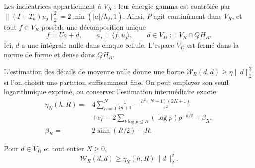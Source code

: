Les indicatrices appartiennent à \(V_R\) : leur énergie gamma est contrôlée par \(\|(I-T_a)u_j\|_2^2=2\min(|a|/h_j,1)\). Ainsi, \(P\) agit continûment dans \(V_R\), et tout \(f\in V_R\) possède une décomposition unique
\begin{equation}
f=Ua+d,\qquad a_j=\langle f,u_j\rangle,\qquad
d\in V_D:=V_R\cap QH_R.
\label{schur-add-display-4}
\end{equation}
Ici, \(d\) a une intégrale nulle dans chaque cellule. L'espace \(V_D\) est
fermé dans la norme de forme et dense dans \(QH_R\).

L'estimation des détails de moyenne nulle donne une borne \(\mathscr W_R(d,d)\geq\eta\|d\|_2^2\) si l'on choisit une partition suffisamment fine. On peut employer son seuil logarithmique exprimé, ou conserver l'estimation intermédiaire exacte
\begin{equation}
\begin{aligned}
\eta_N(h,R)={}&4\sum_{n=0}^N\frac1{4n+1}
-\frac{h^2(N+1)(2N+1)}{\pi^2}\\
&+c_\Gamma-2\sum_{k\log p\leq R}(\log p)p^{-k/2}-\beta_R,\\
\beta_R={}&2\sinh(R/2)-R.
\end{aligned}
\label{schur-add-eq-S1}
\end{equation}
\begin{lemma}
\label{schur-add-retencion-detalles}
Pour \(d\in V_D\) et tout entier \(N\geq0\),
\[
\mathscr W_R(d,d)\geq\eta_N(h,R)\|d\|_2^2.
\]
\end{lemma}
